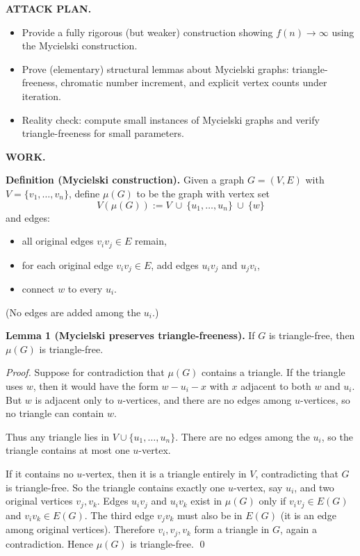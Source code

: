 \medskip
\noindent\textbf{ATTACK PLAN.}
\begin{itemize}
\item Provide a fully rigorous (but weaker) construction showing $f(n)\to\infty$ using the Mycielski construction.
\item Prove (elementary) structural lemmas about Mycielski graphs: triangle-freeness, chromatic number increment, and explicit vertex counts under iteration.
\item Reality check: compute small instances of Mycielski graphs and verify triangle-freeness for small parameters.
\end{itemize}

\medskip
\noindent\textbf{WORK.}

\medskip
\noindent\textbf{Definition (Mycielski construction).}
Given a graph $G=(V,E)$ with $V=\{v_1,\dots,v_n\}$, define $\mu(G)$ to be the graph with vertex set
\[V(\mu(G)):=V\ \cup\ \{u_1,\dots,u_n\}\ \cup\ \{w\}
\]
and edges:
\begin{itemize}
\item all original edges $v_iv_j\in E$ remain,
\item for each original edge $v_iv_j\in E$, add edges $u_iv_j$ and $u_jv_i$,
\item connect $w$ to every $u_i$.
\end{itemize}
(No edges are added among the $u_i$.)

\medskip
\noindent\textbf{Lemma 1 (Mycielski preserves triangle-freeness).}
If $G$ is triangle-free, then $\mu(G)$ is triangle-free.

\noindent\emph{Proof.}
Suppose for contradiction that $\mu(G)$ contains a triangle.
If the triangle uses $w$, then it would have the form $w-u_i-x$ with $x$ adjacent to both $w$ and $u_i$.
But $w$ is adjacent only to $u$-vertices, and there are no edges among $u$-vertices, so no triangle can contain $w$.

Thus any triangle lies in $V\cup\{u_1,\dots,u_n\}$.
There are no edges among the $u_i$, so the triangle contains at most one $u$-vertex.

If it contains no $u$-vertex, then it is a triangle entirely in $V$, contradicting that $G$ is triangle-free.
So the triangle contains exactly one $u$-vertex, say $u_i$, and two original vertices $v_j,v_k$.
Edges $u_i v_j$ and $u_i v_k$ exist in $\mu(G)$ only if $v_i v_j\in E(G)$ and $v_i v_k\in E(G)$.
The third edge $v_jv_k$ must also be in $E(G)$ (it is an edge among original vertices).
Therefore $v_i,v_j,v_k$ form a triangle in $G$, again a contradiction.
Hence $\mu(G)$ is triangle-free. \qed

